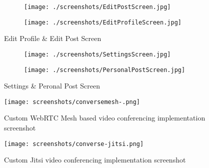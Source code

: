     \begin{figure}[h!]
      \centering
      \begin{subfigure}{.5\textwidth}
        \centering
        \texttt{[image: ./screenshots/EditPostScreen.jpg]}
        \label{fig:editpost}
      \end{subfigure}%
      \begin{subfigure}{.5\textwidth}
        \centering
        \texttt{[image: ./screenshots/EditProfileScreen.jpg]}
        \label{fig:editprofile}
      \end{subfigure}
      \caption{Edit Profile \& Edit Post Screen}
      \label{fig:editpostandprofile}
      \end{figure}

    \begin{figure}[h!]
      \centering
      \begin{subfigure}{.5\textwidth}
        \centering
        \texttt{[image: ./screenshots/SettingsScreen.jpg]}
        \label{fig:settings}
      \end{subfigure}%
      \begin{subfigure}{.5\textwidth}
        \centering
        \texttt{[image: ./screenshots/PersonalPostScreen.jpg]}
        \label{fig:PeronalPost}
      \end{subfigure}
      \caption{Settings \& Peronal Post Screen}
      \label{fig:SettingsandPersonalPost}
      \end{figure}

      \begin{figure}[h!]
        \begin{center}
          \texttt{[image: screenshots/conversemesh-.png]}
        \end{center}
        \caption{Custom WebRTC Mesh based video conferencing implementation screenshot}
      \end{figure}

      \begin{figure}[h!]
        \begin{center}
          \texttt{[image: screenshots/converse-jitsi.png]}
        \end{center}
        \caption{Custom Jitsi video conferencing implementation screenshot}
      \end{figure}